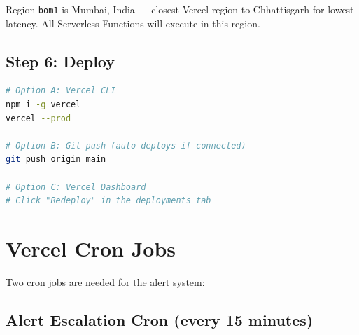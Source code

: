 \documentclass[12pt,a4paper]{report}
\begin{document}
\begin{infobox}
Region \texttt{bom1} is Mumbai, India --- closest Vercel region to Chhattisgarh for lowest latency. All Serverless Functions will execute in this region.
\end{infobox}

\subsection{Step 6: Deploy}

\begin{lstlisting}[language=bash, caption={Deploy options}]
# Option A: Vercel CLI
npm i -g vercel
vercel --prod

# Option B: Git push (auto-deploys if connected)
git push origin main

# Option C: Vercel Dashboard
# Click "Redeploy" in the deployments tab
\end{lstlisting}

\section{Vercel Cron Jobs}

Two cron jobs are needed for the alert system:

\subsection{Alert Escalation Cron (every 15 minutes)}
\end{document}
